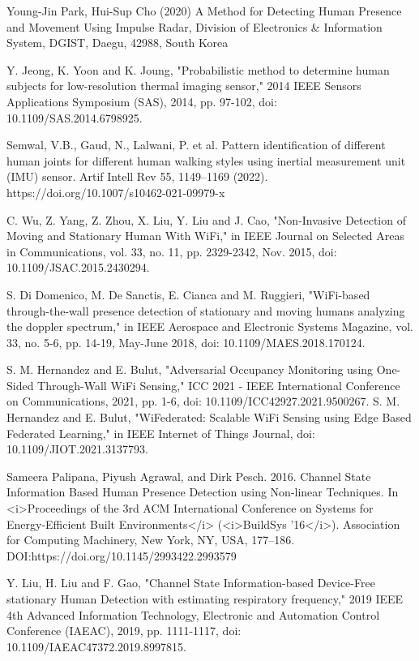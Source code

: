 \documentclass[conference]{IEEEtran}
\begin{document}
\begin{thebibliography}{00}
 Young-Jin Park, Hui-Sup Cho (2020) A Method for Detecting Human Presence and Movement Using Impulse Radar, Division of Electronics \& Information System, DGIST, Daegu, 42988, South Korea

Y. Jeong, K. Yoon and K. Joung, "Probabilistic method to determine human subjects for low-resolution thermal imaging sensor," 2014 IEEE Sensors Applications Symposium (SAS), 2014, pp. 97-102, doi: 10.1109/SAS.2014.6798925.

Semwal, V.B., Gaud, N., Lalwani, P. et al. Pattern identification of different human joints for different human walking styles using inertial measurement unit (IMU) sensor. Artif Intell Rev 55, 1149–1169 (2022). https://doi.org/10.1007/s10462-021-09979-x

C. Wu, Z. Yang, Z. Zhou, X. Liu, Y. Liu and J. Cao, "Non-Invasive Detection of Moving and Stationary Human With WiFi," in IEEE Journal on Selected Areas in Communications, vol. 33, no. 11, pp. 2329-2342, Nov. 2015, doi: 10.1109/JSAC.2015.2430294.

 S. Di Domenico, M. De Sanctis, E. Cianca and M. Ruggieri, "WiFi-based through-the-wall presence detection of stationary and moving humans analyzing the doppler spectrum," in IEEE Aerospace and Electronic Systems Magazine, vol. 33, no. 5-6, pp. 14-19, May-June 2018, doi: 10.1109/MAES.2018.170124.

S. M. Hernandez and E. Bulut, "Adversarial Occupancy Monitoring using One-Sided Through-Wall WiFi Sensing," ICC 2021 - IEEE International Conference on Communications, 2021, pp. 1-6, doi: 10.1109/ICC42927.2021.9500267.
S. M. Hernandez and E. Bulut, "WiFederated: Scalable WiFi Sensing using Edge Based Federated Learning," in IEEE Internet of Things Journal, doi: 10.1109/JIOT.2021.3137793.

Sameera Palipana, Piyush Agrawal, and Dirk Pesch. 2016. Channel State Information Based Human Presence Detection using Non-linear Techniques. In <i>Proceedings of the 3rd ACM International Conference on Systems for Energy-Efficient Built Environments</i> (<i>BuildSys '16</i>). Association for Computing Machinery, New York, NY, USA, 177–186. DOI:https://doi.org/10.1145/2993422.2993579

 Y. Liu, H. Liu and F. Gao, "Channel State Information-based Device-Free stationary Human Detection with estimating respiratory frequency," 2019 IEEE 4th Advanced Information Technology, Electronic and Automation Control Conference (IAEAC), 2019, pp. 1111-1117, doi: 10.1109/IAEAC47372.2019.8997815.


\end{thebibliography}
\end{document}
